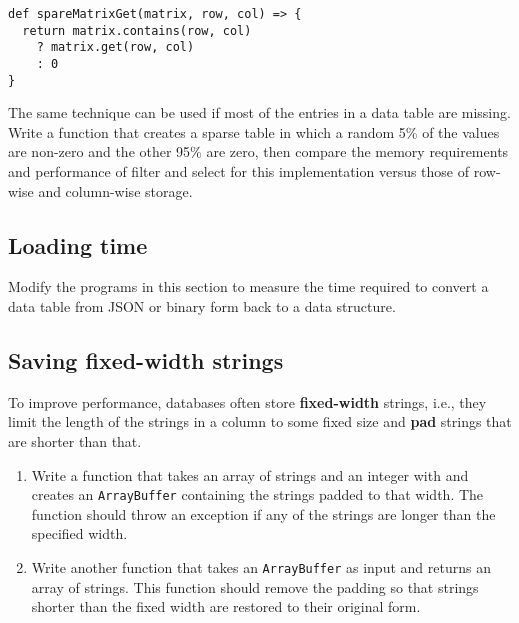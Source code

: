 \documentclass[krantzl]{krantz}
\newcommand{\glossref}[1]{\textbf{#1}}
\begin{document}
\begin{lstlisting}[frame=tblr]
def spareMatrixGet(matrix, row, col) => {
  return matrix.contains(row, col)
    ? matrix.get(row, col)
    : 0
}
\end{lstlisting}


The same technique can be used if most of the entries in a data table are missing.
Write a function that creates a sparse table in which a random 5\% of the values are non-zero
and the other 95\% are zero,
then compare the memory requirements and performance of filter and select for this implementation
versus those of row-wise and column-wise storage.

\subsection*{Loading time}


Modify the programs in this section to measure the time required to convert a data table from JSON or binary form
back to a data structure.

\subsection*{Saving fixed-width strings}


To improve performance,
databases often store \glossref{fixed-width} strings,
i.e.,
they limit the length of the strings in a column to some fixed size
and \glossref{pad} strings that are shorter than that.

\begin{enumerate}

\item 

Write a function that takes an array of strings and an integer with
    and creates an \texttt{ArrayBuffer} containing the strings padded to that width.
    The function should throw an exception if any of the strings
    are longer than the specified width.



\item 

Write another function that takes an \texttt{ArrayBuffer} as input
    and returns an array of strings.
    This function should remove the padding
    so that strings shorter than the fixed width are restored to their original form.



\end{enumerate}
\end{document}

